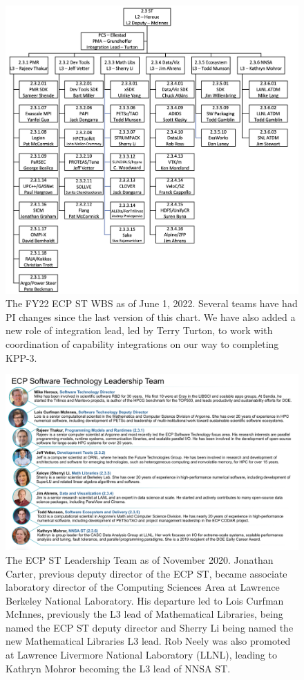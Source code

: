 \begin{figure}
	\centering
	\includegraphics[width=0.9\linewidth]{STFY22WBS}
	\caption{\label{fig:wbs-FY22} The FY22 ECP ST WBS as of June 1, 2022.  Several teams have had PI changes since the last version of this chart.  We have also added a new role of integration lead, led by Terry Turton, to work with coordination of capability integrations on our way to completing KPP-3.}
\end{figure}




\begin{figure}
	\centering
	\includegraphics[width=1.0\linewidth]{ECP-ST-Leads}
	\caption{The ECP ST Leadership Team as of November 2020. Jonathan Carter, previous deputy director of the ECP ST, became associate laboratory director of the Computing Sciences Area at Lawrence Berkeley National Laboratory. His departure led to Lois Curfman McInnes, previously the L3 lead of Mathematical Libraries, being named the ECP ST deputy director and Sherry Li being named the new Mathematical Libraries L3 lead.  Rob Neely was also promoted at Lawrence Livermore National Laboratory (LLNL), leading to Kathryn Mohror becoming the L3 lead of NNSA ST.}
	\label{fig:ecpstleads}
\end{figure}


